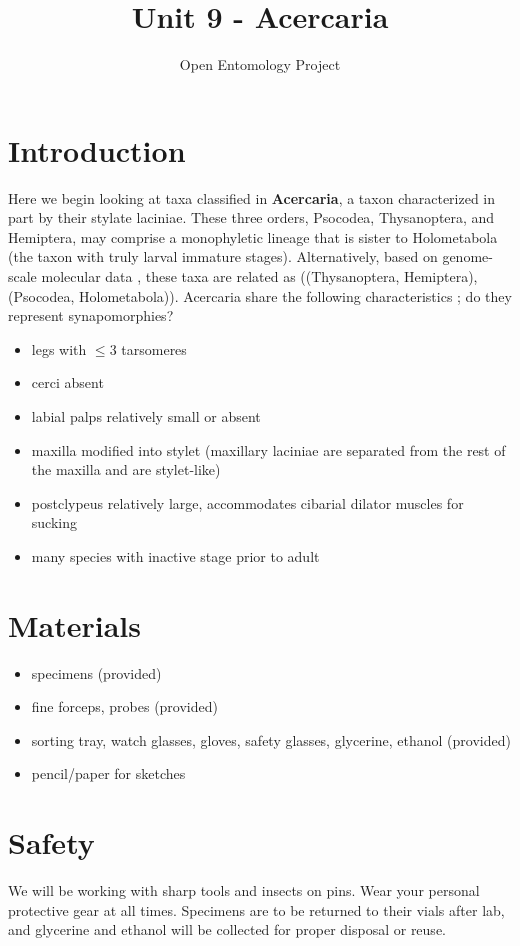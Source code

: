\documentclass[letterpaper, 11pt]{article}
\title{Unit 9 - Acercaria}
\author{Open Entomology Project}
\begin{document}
\cleanlookdateon %
\maketitle
\thispagestyle{fancy}
\section*{Introduction}
Here we begin looking at taxa classified in \textbf{Acercaria}, a taxon characterized in part by their stylate laciniae. These three orders, Psocodea, Thysanoptera, and Hemiptera, may comprise a monophyletic lineage that is sister to Holometabola (the taxon with truly larval immature stages). Alternatively, based on genome-scale molecular data \citep{Misof763}, these taxa are related as ((Thysanoptera, Hemiptera),(Psocodea, Holometabola)). Acercaria share the following characteristics \citep{beutel2013insect}; do they represent synapomorphies?

\begin{itemize}
\item legs with $\le$3 tarsomeres
\item cerci absent 
\item labial palps relatively small or absent 
\item maxilla modified into stylet (maxillary laciniae are separated from the rest of the maxilla and are stylet-like)
\item postclypeus relatively large, accommodates cibarial dilator muscles for sucking
\item many species with inactive stage prior to adult
\end{itemize}

\section*{Materials}

\begin{itemize}
\item specimens (provided)
\item fine forceps, probes (provided)
\item sorting tray, watch glasses, gloves, safety glasses, glycerine, ethanol (provided)
\item pencil/paper for sketches
\end{itemize}

\section*{Safety}
We will be working with sharp tools and insects on pins. Wear your personal protective gear at all times. Specimens are to be returned to their vials after lab, and glycerine and ethanol will be collected for proper disposal or reuse.
\end{document}
